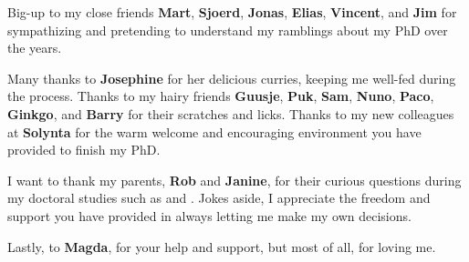\bigbreak \noindent
Big-up to my close friends \textbf{Mart}, \textbf{Sjoerd}, \textbf{Jonas}, \textbf{Elias}, \textbf{Vincent}, and \textbf{Jim} for sympathizing and pretending to understand my ramblings about my PhD over the years. 

\bigbreak \noindent
Many thanks to \textbf{Josephine} for her delicious curries, keeping me well-fed during the process. Thanks to my hairy friends \textbf{Guusje}, \textbf{Puk}, \textbf{Sam}, \textbf{Nuno}, \textbf{Paco}, \textbf{Ginkgo}, and \textbf{Barry} for their scratches and licks. Thanks to my new colleagues at \textbf{Solynta} for the warm welcome and encouraging environment you have provided to finish my PhD. 

\bigbreak \noindent
I want to thank my parents, \textbf{Rob} and \textbf{Janine}, for their curious questions during my doctoral studies such as  and . Jokes aside, I appreciate the freedom and support you have provided in always letting me make my own decisions.

\bigbreak \noindent
Lastly, to \textbf{Magda}, for your help and support, but most of all, for loving me. 

\newpage